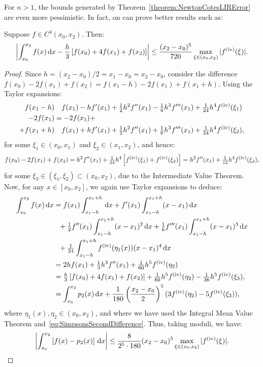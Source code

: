 For $n>1$, the bounds generated by Theorem~\ref{theorem:NewtonCotesLIRError} are even more pessimistic. In fact, on can prove better results such as:
\begin{theorem}
Suppose $f\in C^4(x_0,x_2)$. Then:
\[
\left|\int_{x_0}^{x_2}f(x)\ud x - \dfrac{h}{3}\br[f(x_0)+4f(x_1)+f(x_2)]\right| \le \dfrac{(x_2-x_0)^5}{720}\max_{\xi\in(x_0,x_2)}|f^{({\rm iv})}(\xi)|.
\]
\end{theorem}
\begin{proof}
Since $h = (x_2-x_0)/2 = x_1-x_0 = x_2-x_0$, consider the difference $f(x_0) -2f(x_1)+f(x_2) = f(x_1-h)-2f(x_1)+f(x_1+h)$. Using the Taylor expansions:
\begin{align*}
f(x_1-h) & \quad f(x_1) - hf'(x_1) + \tfrac{1}{2}h^2f''(x_1) - \tfrac{1}{6}h^3f'''(x_1) + \tfrac{1}{24}h^4f^{({\rm iv})}(\xi_1)\\
-2f(x_1) & = -2f(x_1) +\\
+f(x_1+h) & \quad f(x_1) + hf'(x_1) + \tfrac{1}{2}h^2f''(x_1) + \tfrac{1}{6}h^3f'''(x_1) + \tfrac{1}{24}h^4f^{({\rm iv})}(\xi_2),
\end{align*}
for some $\xi_1\in(x_0,x_1)$ and $\xi_2\in(x_1,x_2)$, and hence:
\begin{equation}\label{eq:SimpsonsSecondDifference}
f(x_0)-2f(x_1)+f(x_2) = h^2f''(x_1) + \tfrac{1}{24}h^4\br[f^{({\rm iv})}(\xi_1) + f^{({\rm iv})}(\xi_2)] = h^2f''(x_1) + \tfrac{1}{12}h^4f^{({\rm iv})}(\xi_3),
\end{equation}
for some $\xi_3\in(\xi_1,\xi_2)\subset(x_0,x_2)$, due to the Intermediate Value Theorem. Now, for any $x\in[x_0,x_2]$, we again use Taylor expansions to deduce:
\begin{align*}
\int_{x_0}^{x_2}f(x)\ud x & = f(x_1)\int_{x_1-h}^{x_1+h}\ud x + f'(x_1)\int_{x_1-h}^{x_1+h}(x-x_1)\ud x\\
& ~~ + \tfrac{1}{2}f''(x_1)\int_{x_1-h}^{x_1+h}(x-x_1)^2\ud x + \tfrac{1}{6}f'''(x_1)\int_{x_1-h}^{x_1+h}(x-x_1)^3\ud x\\
& ~~ + \tfrac{1}{24}\int_{x_1-h}^{x_1+h} f^{({\rm iv})}(\eta_1(x))(x-x_1)^4\ud x\\
& = 2hf(x_1) + \tfrac{1}{3}h^3f''(x_1) + \tfrac{1}{60}h^5f^{({\rm iv})}(\eta_2)\\
& = \tfrac{h}{3}\br[f(x_0)+4f(x_1)+f(x_2)] + \tfrac{1}{60}h^5f^{({\rm iv})}(\eta_2) - \tfrac{1}{36}h^5f^{({\rm iv})}(\xi_3),\\
& = \int_{x_0}^{x_2}p_2(x)\ud x + \dfrac{1}{180}\left(\dfrac{x_2-x_0}{2}\right)^5(3f^{({\rm iv})}(\eta_2) - 5f^{({\rm iv})}(\xi_3)),
\end{align*}
where $\eta_1(x),\eta_2\in(x_0,x_2)$, and where we have used the Integral Mean Value Theorem and~\eqref{eq:SimpsonsSecondDifference}. Thus, taking moduli, we have:
\[
\left|\int_{x_0}^{x_2}\br[f(x)-p_2(x)]\ud x\right| \le \dfrac{8}{2^5\cdot180}(x_2-x_0)^5\max_{\xi\in(x_0,x_2)}|f^{({\rm iv})}(\xi)|.
\]
\end{proof}

